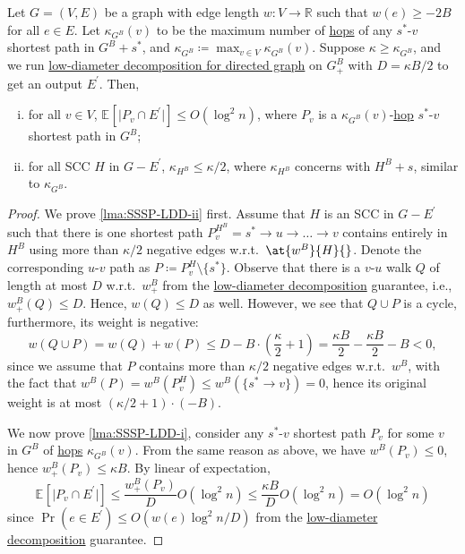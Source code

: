 \begin{lemma}\label{lma:SSSP-LDD}
	Let \(G = (V, E)\) be a graph with edge length \(w \colon V \to \mathbb{R} \) such that \(w(e) \geq -2B\) for all \(e \in E\). Let \(\kappa _{G^B}(v)\) to be the maximum number of \hyperref[not:hop]{hops} of any \(s^{\ast} \)-\(v\) shortest path in \(G^B + s^{\ast} \), and \(\kappa _{G^B}\coloneqq \max _{v \in V} \kappa _{G^B}(v)\). Suppose \(\kappa \geq \kappa _{G^B}\), and we run \hyperref[thm:directed-LDD]{low-diameter decomposition for directed graph} on \(G_{+}^B\) with \(D = \kappa B / 2\) to get an output \(E^{\prime} \). Then,
	\begin{enumerate}[(i)]
		\item\label{lma:SSSP-LDD-i} for all \(v \in V\), \(\mathbb{E}_{}[\lvert P_{v} \cap E^{\prime} \rvert ] \leq O(\log ^2 n)\), where \(P_{v}\) is a \(\kappa _{G^B}(v)\)-\hyperref[not:hop]{hop} \(s^{\ast} \)-\(v\) shortest path in \(G^B\);
		\item\label{lma:SSSP-LDD-ii} for all SCC \(H\) in \(G - E^{\prime} \), \(\kappa _{H^{B} } \leq \kappa / 2\), where \(\kappa _{H^B}\) concerns with \(H^B + s\), similar to \(\kappa _{G^B}\).
	\end{enumerate}
\end{lemma}
\begin{proof}
	We prove \autoref{lma:SSSP-LDD-ii} first. Assume that \(H\) is an SCC in \(G - E^{\prime} \) such that there is one shortest path \(P^{H^B}_{v} = s^{\ast} \to u \to \dots \to v\) contains entirely in \(H^B\) using more than \(\kappa / 2\) negative edges w.r.t.\ \(\at{w^B}{H}{} \). Denote the corresponding \(u\)-\(v\) path as \(P \coloneqq P^H_{v} \setminus \{ s^{\ast} \}\). Observe that there is a \(v\)-\(u\) walk \(Q\) of length at most \(D\) w.r.t.\ \(w_{+}^B\) from the \hyperref[thm:directed-LDD]{low-diameter decomposition} guarantee, i.e., \(w_{+}^B(Q) \leq D\). Hence, \(w(Q) \leq D\) as well. However, we see that \(Q \cup P\) is a cycle, furthermore, its weight is negative:
	\[
		w(Q \cup P)
		= w(Q) + w(P)
		\leq D - B \cdot \left( \frac{\kappa }{2} + 1\right)
		= \frac{\kappa B}{2} - \frac{\kappa B}{2} - B
		< 0,
	\]
	since we assume that \(P\) contains more than \(\kappa / 2\) negative edges w.r.t.\ \(w^B\), with the fact that \(w^B(P) = w^B(P^H_{v}) \leq w^B(\{ s^{\ast} \to v \} ) = 0\), hence its original weight is at most \((\kappa / 2 + 1) \cdot (-B)\).

	We now prove \autoref{lma:SSSP-LDD-i}, consider any \(s^{\ast} \)-\(v\) shortest path \(P_{v}\) for some \(v\) in \(G^B\) of \hyperref[not:hop]{hops} \(\kappa _{G^B}(v)\). From the same reason as above, we have \(w^B(P_{v}) \leq 0\), hence \(w^B_{+}(P_{v}) \leq \kappa B\). By linear of expectation,
	\[
		\mathbb{E}_{}[\lvert P_{v} \cap E^{\prime}  \rvert ]
		\leq \frac{w_{+}^B(P_{v})}{D} O(\log ^2 n)
		\leq \frac{\kappa B}{D} O(\log ^2 n)
		= O(\log ^2 n)
	\]
	since \(\Pr(e \in E^{\prime} ) \leq O(w(e) \log ^2 n / D)\) from the \hyperref[thm:directed-LDD]{low-diameter decomposition} guarantee.
\end{proof}

